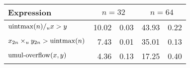 \begin{tabular}{lr@{$\pm$}lr@{$\pm$}l} \toprule
Expression & \multicolumn{2}{c}{$n = 32$} & \multicolumn{2}{c}{$n = 64$} \\ \midrule
$\operatorname{uintmax}(n) /_u x > y$
& 10.02 & 0.03 & 43.93 & 0.22 \\
$x_{2n} \times_{u} y_{2n} > \operatorname{uintmax}(n)$
&  7.43 & 0.01 & 35.01 & 0.13 \\
$\operatorname{umul-overflow}(x, y)$
&  4.36 & 0.13 & 17.25 & 0.40 \\
\bottomrule
\end{tabular}
